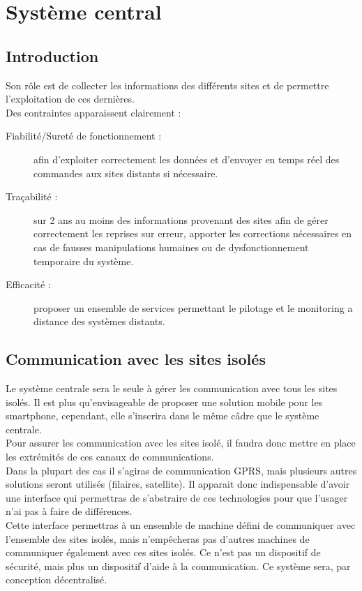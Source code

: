 \section{Système central}

    \subsection{Introduction}
		Son rôle est de collecter les informations des différents sites et de permettre l'exploitation de ces dernières.\\
		Des contraintes apparaissent clairement : 
		\begin{description}
				\item[Fiabilité/Sureté de fonctionnement :] afin d'exploiter correctement les données et d'envoyer en temps réel des commandes aux sites distants si nécessaire.
				\item[Traçabilité :] sur 2 ans au moins des informations provenant des sites afin de gérer correctement les reprises sur erreur, apporter les corrections nécessaires en cas de fausses manipulations humaines ou de dysfonctionnement temporaire du système.
				\item[Efficacité :] proposer un ensemble de services permettant le pilotage et le monitoring a distance des systèmes distants.
		\end{description}


    \subsection{Communication avec les sites isolés}
    
        Le système centrale sera le seule à gérer les communication avec tous les sites isolés.
        Il est plus qu'envisageable de proposer une solution mobile pour les smartphone, cependant, elle s'inscrira dans le même câdre que le système centrale.\\
        
        Pour assurer les communication avec les sites isolé, il faudra donc mettre en place les extrémités de ces canaux de communications.\\
        Dans la plupart des cas il s'agiras de communication GPRS, mais plusieurs autres solutions seront utilisés (filaires, satellite).
        Il apparait donc indispensable d'avoir une interface qui permettras de s'abstraire de ces technologies pour que l'usager n'ai pas à faire de différences.\\
        Cette interface permettras à un ensemble de machine défini de communiquer avec l'ensemble des sites isolés, mais n'empêcheras pas d'autres machines de communiquer également avec ces sites isolés. Ce n'est pas un dispositif de sécurité, mais plus un dispositif d'aide à la communication. Ce système sera, par conception décentralisé.\\
        
